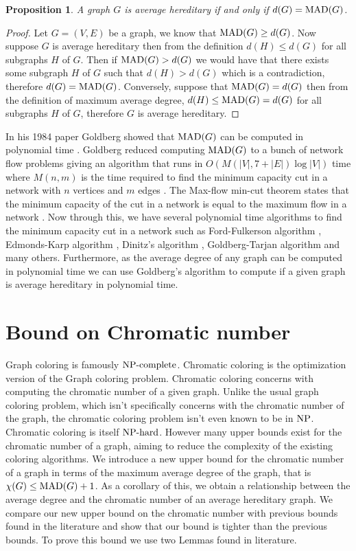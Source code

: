 \documentclass{article}
\newcommand{\classX}[1]{\ensuremath{\text{\textsf{\textbf{#1}}}}}
\newcommand{\classNP}{\classX{NP}}
\newcommand{\NPC}{\classX{NP-complete}}
\newcommand{\NPH}{\classX{NP-hard}}
\newcommand{\MAD}{\ensuremath{\text{\textit{MAD}}}}
\newtheorem{proposition}{Proposition}
\begin{document}
\begin{proposition}\label{equivalent}
    A graph $G$ is average hereditary if and only if $d(G) = \MAD(G)$.
\end{proposition}
\begin{proof}
    Let $G = (V,E)$ be a graph, we know that $\MAD(G) \geq d(G)$. 
    Now suppose $G$ is average hereditary then from the definition $d(H) \leq d(G)$ for all subgraphs $H$ of $G$.
    Then if $\MAD(G) > d(G)$ we would have that there exists some subgraph $H$ of $G$ such that $d(H) > d(G)$ which is a contradiction, therefore $d(G) = \MAD(G)$.
    Conversely, suppose that $\MAD(G) = d(G)$ then from the definition of maximum average degree, $d(H) \leq \MAD(G) = d(G)$ for all subgraphs $H$ of $G$, therefore $G$ is average hereditary.
\end{proof}
In his 1984 paper Goldberg showed that $\MAD(G)$ can be computed in polynomial time \cite{12}.  
Goldberg reduced computing $\MAD(G)$ to a bunch of network flow problems giving an algorithm that runs in $O(M(|V|, 7 + |E|)\log |V|)$ time where $M(n, m)$ is the time required to find the minimum capacity cut in a network with $n$ vertices and $m$ edges \cite{12}.
The Max-flow min-cut theorem states that the minimum capacity of the cut in a network is equal to the maximum flow in a network \cite{1,2,8,14}. 
Now through this, we have several polynomial time algorithms to find the minimum capacity cut in a network such as Ford-Fulkerson algorithm \cite{8}, Edmonds-Karp algorithm \cite{13}, Dinitz's algorithm \cite{16}, Goldberg-Tarjan algorithm \cite{15} and many others. 
Furthermore, as the average degree of any graph can be computed in polynomial time we can use Goldberg's algorithm to compute if a given graph is average hereditary in polynomial time.



\section{Bound on Chromatic number}\label{sec: bound}
Graph coloring is famously $\NPC$.
Chromatic coloring is the optimization version of the Graph coloring problem. Chromatic coloring concerns with computing the chromatic number of a given graph. Unlike the usual graph coloring problem, which isn't specifically concerns with the chromatic number of the graph, the chromatic coloring problem isn't even known to be in \classNP. Chromatic coloring is itself \NPH. However many upper bounds exist for the chromatic number of a graph, aiming to reduce the complexity of the existing coloring algorithms. 
We introduce a new upper bound for the chromatic number of a graph in terms of the maximum average degree of the graph, that is $\chi(G) \leq \MAD(G)+1$. As a corollary of this, we obtain a relationship between the average degree and the chromatic number of an average hereditary graph. We compare our new upper bound on the chromatic number with previous bounds found in the literature and show that our bound is tighter than the previous bounds.
To prove this bound we use two Lemmas found in literature.
\end{document}
